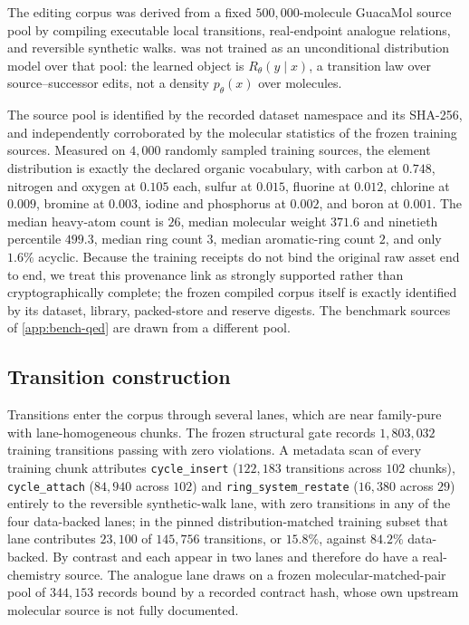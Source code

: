 The editing corpus was derived from a fixed $500{,}000$-molecule GuacaMol source pool by compiling executable local transitions, real-endpoint analogue relations, and reversible synthetic walks. \method{} was not trained as an unconditional distribution model over that pool: the learned object is $R_\theta(y\mid x)$, a transition law over source--successor edits, not a density $p_\theta(x)$ over molecules.

The source pool is identified by the recorded dataset namespace and its SHA-256, and independently corroborated by the molecular statistics of the frozen training sources. Measured on $4{,}000$ randomly sampled training sources, the element distribution is exactly the declared organic vocabulary, with carbon at $0.748$, nitrogen and oxygen at $0.105$ each, sulfur at $0.015$, fluorine at $0.012$, chlorine at $0.009$, bromine at $0.003$, iodine and phosphorus at $0.002$, and boron at $0.001$. The median heavy-atom count is $26$, median molecular weight $371.6$ and ninetieth percentile $499.3$, median ring count $3$, median aromatic-ring count $2$, and only $1.6\%$ acyclic. Because the training receipts do not bind the original raw asset end to end, we treat this provenance link as strongly supported rather than cryptographically complete; the frozen compiled corpus itself is exactly identified by its dataset, library, packed-store and reserve digests. The benchmark sources of \cref{app:bench-qed} are drawn from a different pool.

\subsection{Transition construction}

Transitions enter the corpus through several lanes, which are near family-pure with lane-homogeneous chunks. The frozen structural gate records $1{,}803{,}032$ training transitions passing with zero violations. A metadata scan of every training chunk attributes \texttt{cycle\_insert} ($122{,}183$ transitions across $102$ chunks), \texttt{cycle\_attach} ($84{,}940$ across $102$) and \texttt{ring\_system\_restate} ($16{,}380$ across $29$) entirely to the reversible synthetic-walk lane, with zero transitions in any of the four data-backed lanes; in the pinned distribution-matched training subset that lane contributes $23{,}100$ of $145{,}756$ transitions, or $15.8\%$, against $84.2\%$ data-backed. By contrast  and  each appear in two lanes and therefore do have a real-chemistry source. The analogue lane draws on a frozen molecular-matched-pair pool of $344{,}153$ records bound by a recorded contract hash, whose own upstream molecular source is not fully documented.

